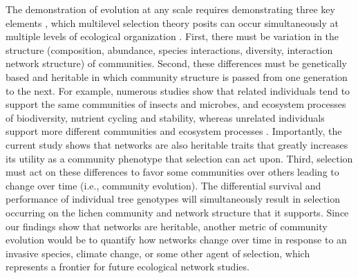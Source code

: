 \documentclass[fleqn,12pt]{olplainarticle}
\begin{document}
The demonstration of evolution at any scale requires demonstrating
three key elements \citep{Conner2004ATextbook}, which multilevel
selection theory posits can occur simultaneously at multiple levels of
ecological organization \citep{Whitham2003,
  Whitham2020IntraspecificEvolution}. First, there must be variation
in the structure (composition, abundance, species interactions,
diversity, interaction network structure) of communities. Second,
these differences must be genetically based and heritable in which
community structure is passed from one generation to the next. For
example, numerous studies show that related individuals tend to
support the same communities of insects and microbes, and ecosystem
processes of biodiversity, nutrient cycling and stability, whereas
unrelated individuals support more different communities and ecosystem
processes \citep{Bangert2006, Bangert2008a, Barbour2009c,
  Whitham2020IntraspecificEvolution}. Importantly, the current study
shows that networks are also heritable traits that greatly increases
its utility as a community phenotype that selection can act
upon. Third, selection must act on these differences to favor some
communities over others leading to change over time (i.e., community
evolution). The differential survival and performance of individual
tree genotypes will simultaneously result in selection occurring on
the lichen community and network structure that it supports. Since our
findings show that networks are heritable, another metric of community
evolution would be to quantify how networks change over time in
response to an invasive species, climate change, or some other agent
of selection, which represents a frontier for future ecological
network studies.
\end{document}
